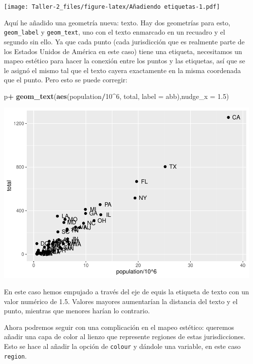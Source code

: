 \documentclass[
]{article}
\newenvironment{Shaded}{\begin{snugshade}}{\end{snugshade}}
\newcommand{\AttributeTok}[1]{\textcolor[rgb]{0.13,0.29,0.53}{#1}}
\newcommand{\DecValTok}[1]{\textcolor[rgb]{0.00,0.00,0.81}{#1}}
\newcommand{\FloatTok}[1]{\textcolor[rgb]{0.00,0.00,0.81}{#1}}
\newcommand{\FunctionTok}[1]{\textcolor[rgb]{0.13,0.29,0.53}{\textbf{#1}}}
\newcommand{\NormalTok}[1]{#1}
\newcommand{\SpecialCharTok}[1]{\textcolor[rgb]{0.81,0.36,0.00}{\textbf{#1}}}
\begin{document}
\texttt{[image: Taller-2\_files/figure-latex/Añadiendo etiquetas-1.pdf]}

Aquí he añadido una geometría nueva: texto. Hay dos geometrías para
esto, \texttt{geom\_label} y \texttt{geom\_text}, uno con el texto
enmarcado en un recuadro y el segundo sin ello. Ya que cada punto (cada
jurisdicción que es realmente parte de los Estados Unidos de América en
este caso) tiene una etiqueta, necesitamos un mapeo estético para hacer
la conexión entre los puntos y las etiquetas, así que se le asignó el
mismo tal que el texto cayera exactamente en la misma coordenada que el
punto. Pero esto se puede corregir:

\begin{Shaded}
\begin{Highlighting}[]
\NormalTok{p}\SpecialCharTok{+}
  \FunctionTok{geom\_text}\NormalTok{(}\FunctionTok{aes}\NormalTok{(population}\SpecialCharTok{/}\DecValTok{10}\SpecialCharTok{\^{}}\DecValTok{6}\NormalTok{, total, }\AttributeTok{label =}\NormalTok{ abb),}\AttributeTok{nudge\_x =} \FloatTok{1.5}\NormalTok{)}
\end{Highlighting}
\end{Shaded}

\includegraphics{Taller-2_files/figure-latex/Empujando etiquetas en el eje-1.pdf}

En este caso hemos empujado a través del eje de equis la etiqueta de
texto con un valor numérico de 1.5. Valores mayores aumentarían la
distancia del texto y el punto, mientras que menores harían lo
contrario.

Ahora podremos seguir con una complicación en el mapeo estético:
queremos añadir una capa de color al lienzo que represente regiones de
estas jurisdicciones. Esto se hace al añadir la opción de
\texttt{colour} y dándole una variable, en este caso \texttt{region}.
\end{document}
